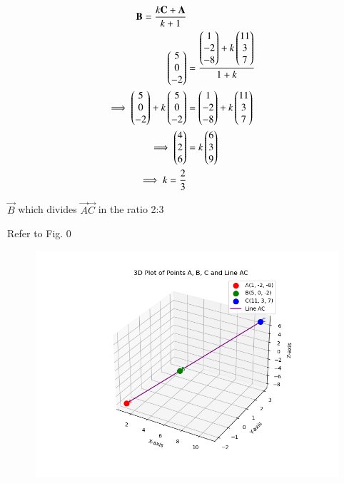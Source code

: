 \documentclass[journal]{IEEEtran}
\begin{document}
\begin{align}
    \mathbf{B}=\frac{k\mathbf{C}+\mathbf{A}}{k+1}\\
             \begin{pmatrix}5\\0\\-2\end{pmatrix} &=\frac{{\begin{pmatrix}1\\-2\\-8\end{pmatrix}+k\begin{pmatrix}11\\3\\7\end{pmatrix}}}{1+k}\\
    \implies\begin{pmatrix}5\\0\\-2\end{pmatrix} + k\begin{pmatrix}5\\0\\-2\end{pmatrix} &=\begin{pmatrix}1\\-2\\-8\end{pmatrix}+k\begin{pmatrix}11\\3\\7\end{pmatrix}\\ 
    \implies \begin{pmatrix}4 \\2 \\6\end{pmatrix} &= k\begin{pmatrix}6 \\ 3 \\9\end{pmatrix}\\
    \implies k = \frac{2}{3}
\end{align}

 $\vec{B}$ which divides  $\vec{A}\vec{C}$ in the ratio 2:3


Refer to Fig. 0

\begin{figure}[H]
\begin{center}
\includegraphics[width=0.6\columnwidth]{figs/Fig.png}
\end{center}
\caption{}
\label{fig:Fig}
\end{figure}
\end{document}
